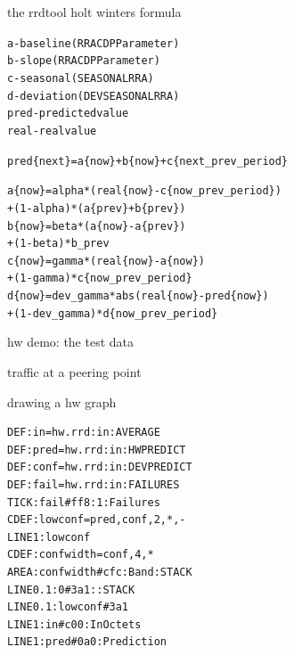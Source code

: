 
\begin{frame}[fragile]{the rrdtool holt winters formula}
\begin{small}
\begin{alltt}
a - baseline (RRA CDP Parameter)
b - slope (RRA CDP Parameter)
c - seasonal (SEASONAL RRA)
d - deviation (DEVSEASONAL RRA)
pred - predicted value
real - real value\pause

pred\{next\} = a\{now\} + b\{now\} + c\{next_prev_period\}\pause

a\{now\} = alpha * (real\{now\} - c\{now_prev_period\}) 
         + (1-alpha) * ( a\{prev\} + b\{prev\})\pause
b\{now\} = beta  * (a\{now\} - a\{prev\}) 
         + (1-beta) * b_prev\pause
c\{now\} = gamma * (real\{now\} - a\{now\}) 
         + (1-gamma) * c\{now_prev_period\}\pause
d\{now\} = dev_gamma * abs(real\{now\} - pred\{now\}) 
         + (1-dev_gamma) * d\{now_prev_period\}\pause

\end{alltt}
\end{small}
\end{frame}


\begin{frame}{hw demo: the test data}

traffic at a peering point
\end{frame}

\begin{frame}[fragile]{drawing a hw graph}
\begin{lstlisting}[language=xml]
DEF:in=hw.rrd:in:AVERAGE
DEF:pred=hw.rrd:in:HWPREDICT
DEF:conf=hw.rrd:in:DEVPREDICT
DEF:fail=hw.rrd:in:FAILURES
TICK:fail#ff8:1:Failures
CDEF:lowconf=pred,conf,2,*,-
LINE1:lowconf
CDEF:confwidth=conf,4,*
AREA:confwidth#cfc:Band:STACK
LINE0.1:0#3a1::STACK
LINE0.1:lowconf#3a1
LINE1:in#c00:InOctets
LINE1:pred#0a0:Prediction
\end{lstlisting}
\end{frame}  


